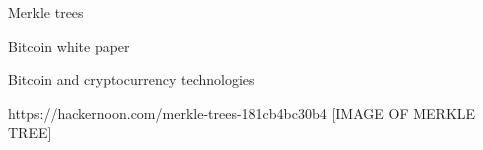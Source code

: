 \documentclass{l4proj}
\begin{document}





Merkle trees

Bitcoin white paper

Bitcoin and cryptocurrency technologies

https://hackernoon.com/merkle-trees-181cb4bc30b4
[IMAGE OF MERKLE TREE] 
\end{document}
